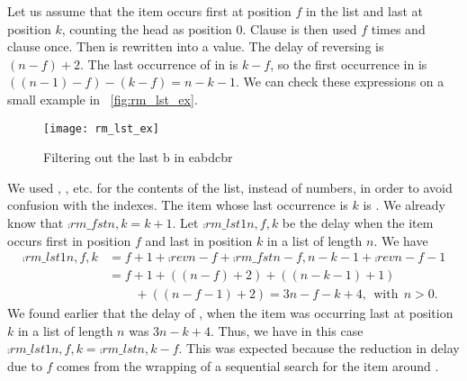 Let us assume that the item occurs first at position \(f\) in the list
and last at position \(k\), counting the head as position
\(0\). Clause \clause{\gamma} is then used \(f\) times and clause
\clause{\beta} once. Then  is
rewritten into a value. The delay of reversing \erlcode{[I|L]} is
\((n-f)+2\). The last occurrence of  in \erlcode{[I|L]} is
\(k-f\), so the first occurrence in  is
\(((n-1)-f)-(k-f)=n-k-1\). We can check these expressions on a small
example in \fig~\vref{fig:rm_lst_ex}.
\begin{figure}
\centering
\texttt{[image: rm\_lst\_ex]}
\caption{Filtering out the last \textsf{b} in \textsf{eabdcbr}
\label{fig:rm_lst_ex}}
\end{figure}
We used , ,  etc. for the contents of
the list, instead of numbers, in order to avoid confusion with the
indexes. The item whose last occurrence is \(k\) is . We
already know that \(\comp{rm\_fst}{n,k} = k + 1\). Let
\(\comp{rm\_lst1}{n,f,k}\) be the delay when the item occurs first in
position \(f\) and last in position \(k\) in a list of length
\(n\). We have
\begin{align*}
\comp{rm\_lst1}{n,f,k} 
  &= f + 1 + \comp{rev}{n-f} + \comp{rm\_fst}{n-f,n-k-1}
     + \comp{rev}{n-f-1}\\
  &= f + 1 + ((n-f)+2) + ((n-k-1)+1)\\
  &\phantom{= f\;} + ((n-f-1)+2)
   = 3n - f - k + 4,\,\; \text{with} \,\; n > 0.
\end{align*}
We found earlier that the delay of , when the item
was occurring last at position \(k\) in a list of length \(n\) was
\(3n - k + 4\). Thus, we have in this case \(\comp{rm\_lst1}{n,f,k} =
\comp{rm\_lst}{n,k} - f\). This was expected because the reduction in
delay due to \(f\) comes from the wrapping of a sequential search for
the item around .


